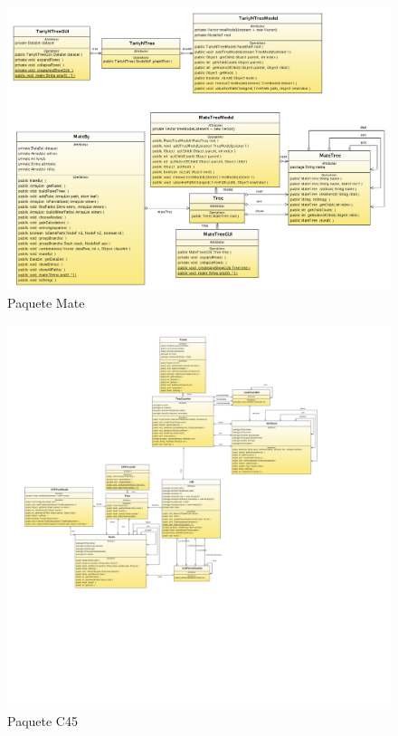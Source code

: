 \begin{figure}[ht]
\centering
\includegraphics[angle=90, width=1.0\textwidth]{imgsClases/Mate.png}
\caption{Paquete Mate}
\end{figure}
\newpage
\begin{figure}[ht]
\centering
\includegraphics[angle=90, width=1.3\textwidth]{imgsClases/c45b.png}
\caption{Paquete C45}
\end{figure}


